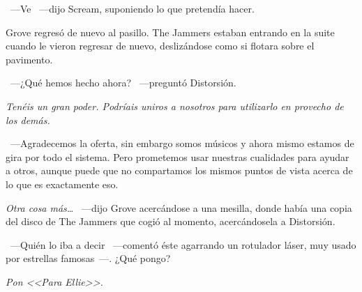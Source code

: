 ~---Ve ~---dijo Scream, suponiendo lo que pretendía hacer.

Grove regresó de nuevo al pasillo. The Jammers estaban entrando en la suite cuando le vieron regresar de nuevo, deslizándose como si flotara sobre el pavimento.

~---¿Qué hemos hecho ahora? ~---preguntó Distorsión.

\emph{Tenéis un gran poder. Podríais uniros a nosotros para utilizarlo en provecho de los demás.}

~---Agradecemos la oferta, sin embargo somos músicos y ahora mismo estamos de gira por todo el sistema. Pero prometemos usar nuestras cualidades para ayudar a otros, aunque puede que no compartamos los mismos puntos de vista acerca de lo que es exactamente eso.

\emph{Otra cosa más\dots} ~---dijo Grove acercándose a una mesilla, donde había una copia del disco de The Jammers que cogió al momento, acercándosela a Distorsión.

~---Quién lo iba a decir ~---comentó éste agarrando un rotulador láser, muy usado por estrellas famosas~---. ¿Qué pongo?

\emph{Pon <<Para Ellie>>.}

\endinput
